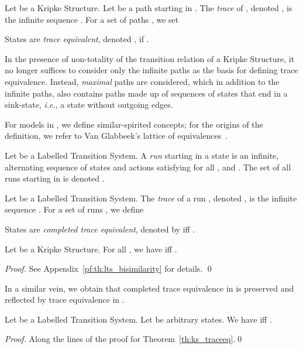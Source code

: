 \documentclass{llncs}
\newcommand{\ie}{\emph{i.e.}}
\begin{document}
\newcommand{\trace}[1]{\ensuremath{\mathsf{Trace}(#1)}}
\newcommand{\traces}[1]{\ensuremath{\mathsf{Traces}(#1)}}
\newcommand{\traceeq}{\ensuremath{\simeq_{\mathrm{t}}}}

\begin{definition} Let  be a Kripke
Structure. Let  be a path starting in . The
\emph{trace} of , denoted , is the infinite sequence
.  For a set of paths , we set

States  are \emph{trace equivalent}, denoted , if .
\end{definition}

\begin{remark} In the presence of non-totality of the transition relation
of a Kripke Structure, it no longer suffices to consider only the
infinite paths as the basis for defining trace equivalence. Instead,
\emph{maximal} paths are considered, which in addition to the infinite
paths, also contains paths made up of sequences of states that end in
a sink-state, \ie, a state without outgoing edges.
\end{remark}
For models in \LTS, we define similar-spirited concepts; for the
origins of the definition, we refer to Van Glabbeek's lattice of
equivalences~\cite{vanGlabbeek01}.


\newcommand{\runs}[1]{\ensuremath{\mathsf{Runs}(#1)}}
\newcommand{\bareruns}[1]{\ensuremath{\mathsf{Runs_b}(#1)}}
\begin{definition} Let  be a Labelled
Transition System.  A \emph{run} starting in a state  is an
infinite, alternating sequence of states and actions  satisfying  for all , and
.  The set of all runs starting in  is denoted .

\end{definition}


\begin{definition} Let  be a Labelled
Transition System.  The \emph{trace} of a run , denoted , is the infinite sequence
.  For a set of runs , we define

States  are \emph{completed trace equivalent}, denoted by
 iff .

\end{definition}



\begin{theorem}
\label{th:ks_traceeq}
Let  be a Kripke Structure. For all
, we have  iff
.
\end{theorem}

\begin{proof}
See Appendix~\ref{pf:th:lts_bisimilarity} for details.
\qed
\end{proof}
In a similar vein, we obtain that completed trace equivalence in
\LTS is preserved and reflected by trace equivalence in \KS.
\begin{theorem}
\label{th:lts_traceeq}
Let  be a Labelled Transition System.
Let  be arbitrary states. We have  iff
.

\end{theorem}
\begin{proof}
Along the lines of the proof for Theorem~\ref{th:ks_traceeq}.\qed
\end{proof}
\end{document}
